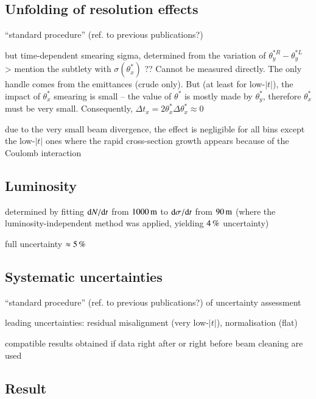 \subsection{Unfolding of resolution effects}

\> ``standard procedure'' (ref. to previous publications?)

\> but time-dependent smearing sigma, determined from the variation of $\theta_y^{*R} - \theta_y^{*L}$
\>> mention the subtlety with $\sigma(\theta_x^*)$ ?? Cannot be measured directly. The only handle comes from the emittances (crude only). But (at least for low-$|t|$), the impact of $\theta_x^*$ smearing is small -- the value of $\theta^*$ is mostly made by $\theta_y^*$, therefore $\theta_x^*$ must be very small. Consequently, $\Delta t_x = 2 \theta_x^* \Delta \theta_x^* \approx 0$

\> due to the very small beam divergence, the effect is negligible for all bins except the low-$|t|$ ones where the rapid cross-section growth appears because of the Coulomb interaction

\subsection{Luminosity}

\> determined by fitting ${\rm d} N/{\rm d} t$ from $1000\,{\rm m}$ to ${\rm d}\sigma/{\rm d} t$ from $90\,{\rm m}$ (where the luminosity-independent method was applied, yielding $4\,{\rm \%}$ uncertainty)

\> full uncertainty $\approx 5\,{\rm \%}$


\subsection{Systematic uncertainties}

\> ``standard procedure'' (ref. to previous publications?) of uncertainty assessment

\> leading uncertainties: residual misalignment (very low-$|t|$), normalisation (flat)

\> compatible results obtained if data right after or right before beam cleaning are used



\subsection{Result}

